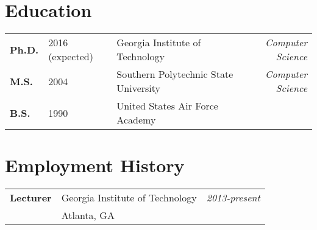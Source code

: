 \documentclass[12pt]{gatech-thesis}
\begin{document}
\begin{postliminary}
{}
\begin{vita}

\section{Education}

\begin{tabular}{lllr}
\textbf{Ph.D.} & 2016 (expected) & Georgia Institute of Technology &
{\sl Computer Science}\\
\textbf{M.S.} &  2004 & Southern Polytechnic State University &
{\sl Computer Science}\\
\textbf{B.S.} & 1990 & United States Air Force Academy & \\
\end{tabular}

\section{Employment History}

\begin{tabular}{llr}

\textbf{Lecturer} & Georgia Institute of Technology
                               &{\sl 2013-present}\\
                            & Atlanta, GA & \\


\end{tabular}
\end{vita}
\end{postliminary}
\end{document}
